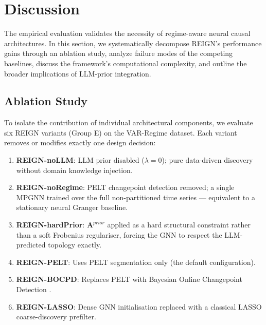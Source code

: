 \section{Discussion}

The empirical evaluation validates the necessity of regime-aware neural causal architectures. In this section, we systematically decompose REIGN's performance gains through an ablation study, analyze failure modes of the competing baselines, discuss the framework's computational complexity, and outline the broader implications of LLM-prior integration.

\subsection{Ablation Study}
\label{sec:ablation}

To isolate the contribution of individual architectural components, we evaluate six REIGN variants (Group E) on the VAR-Regime dataset. Each variant removes or modifies exactly one design decision:

\begin{enumerate}
    \item \textbf{REIGN-noLLM}: LLM prior disabled ($\lambda=0$); pure data-driven discovery without domain knowledge injection.
    \item \textbf{REIGN-noRegime}: PELT changepoint detection removed; a single MPGNN trained over the full non-partitioned time series — equivalent to a stationary neural Granger baseline.
    \item \textbf{REIGN-hardPrior}: $\mathbf{A}^{prior}$ applied as a hard structural constraint rather than a soft Frobenius regulariser, forcing the GNN to respect the LLM-predicted topology exactly.
    \item \textbf{REIGN-PELT}: Uses PELT segmentation only (the default configuration).
    \item \textbf{REIGN-BOCPD}: Replaces PELT with Bayesian Online Changepoint Detection \cite{Adams2007}.
    \item \textbf{REIGN-LASSO}: Dense GNN initialisation replaced with a classical LASSO coarse-discovery prefilter.
\end{enumerate}

